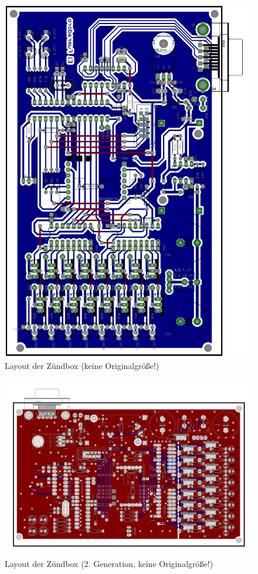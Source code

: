 \documentclass[paper=a4, parskip, numbers=noenddot, toc=listof, headsepline]{scrbook}
\begin{document}
			\begin{figure}
				\centering
				\includegraphics[height=.95\textheight,keepaspectratio]{Bilder/Zuendboxlayout}
				\caption{Layout der Zündbox (keine Originalgröße!)}
				\label{fig:zuendboxlayout}
			\end{figure}

			\begin{figure}
				\centering
				\includegraphics[angle=90, height=.95\textheight,keepaspectratio]{Bilder/Zuendboxlayout2}
				\caption{Layout der Zündbox (2. Generation, keine Originalgröße!)}
				\label{fig:zuendbox2layout}
			\end{figure}
\end{document}

